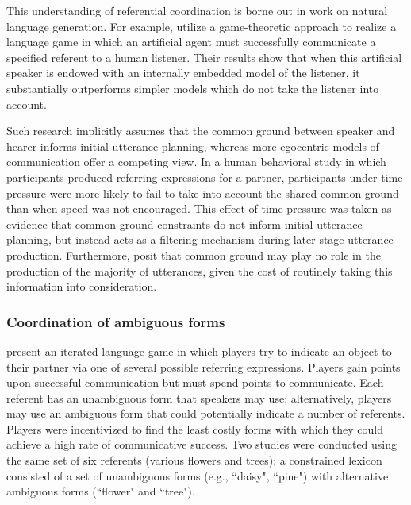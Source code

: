\documentclass[a4paper,11pt]{article}
\begin{document}
This understanding of referential coordination is borne out in work on natural language generation. For example,  utilize a game-theoretic approach to realize a language game in which an artificial agent must successfully communicate a specified referent to a human listener. Their results show that when this artificial speaker is endowed with an internally embedded model of the listener, it substantially outperforms simpler models which do not take the listener into account.

Such research implicitly assumes that the common ground between speaker and hearer informs initial utterance planning, whereas more egocentric models of communication offer a competing view. In a human behavioral study \cite{horton1996} in which participants produced referring expressions for a partner, participants under time pressure were more likely to fail to take into account the shared common ground than when speed was not encouraged. This effect of time pressure was taken as evidence that common ground constraints do not inform initial utterance planning, but instead acts as a filtering mechanism during later-stage utterance production. Furthermore,  posit that common ground may play no role in the production of the majority of utterances, given the cost of routinely taking this information into consideration.

\subsubsection{Coordination of ambiguous forms}
 present an iterated language game in which players try to indicate an object to their partner via one of several possible referring expressions. Players gain points upon successful communication but must spend points to communicate. Each referent has an unambiguous form that speakers may use; alternatively, players may use an ambiguous form that could potentially indicate a number of referents. Players were incentivized to find the least costly forms with which they could achieve a high rate of communicative success. Two studies were conducted using the same set of six referents (various flowers and trees); a constrained lexicon consisted of a set of unambiguous forms (e.g., ``daisy", ``pine") with alternative ambiguous forms (``flower" and ``tree").
\end{document}
